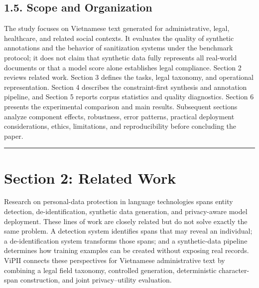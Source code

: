 \documentclass[
]{article}
\begin{document}
\subsection{1.5. Scope and Organization}\label{scope-and-organization}

The study focuses on Vietnamese text generated for administrative,
legal, healthcare, and related social contexts. It evaluates the quality
of synthetic annotations and the behavior of sanitization systems under
the benchmark protocol; it does not claim that synthetic data fully
represents all real-world documents or that a model score alone
establishes legal compliance. Section 2 reviews related work. Section 3
defines the tasks, legal taxonomy, and operational representation.
Section 4 describes the constraint-first synthesis and annotation
pipeline, and Section 5 reports corpus statistics and quality
diagnostics. Section 6 presents the experimental comparison and main
results. Subsequent sections analyze component effects, robustness,
error patterns, practical deployment considerations, ethics,
limitations, and reproducibility before concluding the paper.

\begin{center}\rule{0.5\linewidth}{0.5pt}\end{center}

\section{Section 2: Related Work}\label{section-2-related-work}

Research on personal-data protection in language technologies spans
entity detection, de-identification, synthetic data generation, and
privacy-aware model deployment. These lines of work are closely related
but do not solve exactly the same problem. A detection system identifies
spans that may reveal an individual; a de-identification system
transforms those spans; and a synthetic-data pipeline determines how
training examples can be created without exposing real records. ViPII
connects these perspectives for Vietnamese administrative text by
combining a legal field taxonomy, controlled generation, deterministic
character-span construction, and joint privacy--utility evaluation.
\end{document}
